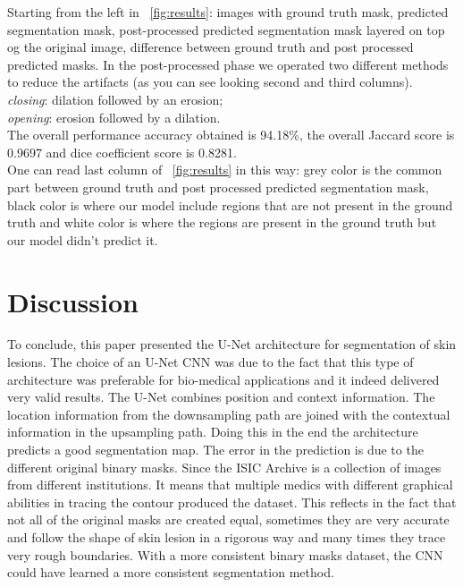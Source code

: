 \documentclass[12pt,a4paper,oneside]{report} %
\begin{document}
Starting from the left in \figurename~\ref{fig:results}: images with ground truth mask, predicted segmentation mask, post-processed predicted segmentation mask layered on top og the original image, difference between ground truth and post processed predicted masks. 
In the post-processed phase we operated two different methods to reduce the artifacts (as you can see looking second and third columns).\\
\newline
\textit{closing}: dilation followed by an erosion;\\
\textit{opening}: erosion followed by a dilation.\\

The overall performance accuracy obtained is 94.18\%, the overall Jaccard score is 0.9697 and dice coefficient score is 0.8281.\\

One can read last column of \figurename~\ref{fig:results} in this way: grey color is the common part between ground truth and post processed predicted segmentation mask, black color 
is where our model include regions that are not present in the ground truth and white color is where the regions are present in the ground truth but our model didn't predict it.

\chapter*{Discussion}
\setcounter{secnumdepth}{0}
To conclude, this paper presented the U-Net architecture for segmentation of skin lesions. The choice of an U-Net CNN was due to the fact that this type of architecture was preferable 
for bio-medical applications and it indeed delivered very valid results.
The U-Net combines position and context information. The location information from the downsampling path are joined with the contextual information in the upsampling path. Doing this in the end the architecture predicts a good segmentation map. 
The error in the prediction is due to the different original binary masks. 
Since the ISIC Archive is a collection of images from different institutions. It means that multiple medics with different graphical abilities in tracing the contour produced the dataset. This reflects in the fact that not all of the original masks are created equal, sometimes they are very accurate and follow the shape of skin lesion in a rigorous way and many times they trace very rough boundaries. With a more consistent binary masks dataset, the CNN could have learned a more consistent segmentation method.\\
\end{document}

